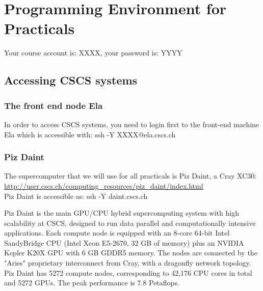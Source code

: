 \documentclass[a4paper,pagesize,12pt]{scrbook}
\begin{document}
\section*{Programming Environment for Practicals}
Your course account is: XXXX, your password is: YYYY

\subsection*{Accessing CSCS systems }
\subsubsection*{The front end node Ela}
In order to access CSCS systems, you need to login first to the front-end machine Ela which is accessible with: \colorbox{mycolor}{ssh -Y XXXX@ela.cscs.ch}

\subsubsection*{Piz Daint}
The supercomputer that we will use for all practicals is Piz Daint, a Cray XC30:\\
\url{ http://user.cscs.ch/computing_resources/piz_daint/index.html}\\
Piz Daint is accessible as: \colorbox{mycolor}{ssh -Y daint.cscs.ch}

Piz Daint is the main GPU/CPU hybrid supercomputing system with high scalability at CSCS, designed to run data parallel and computationally intensive applications.
Each compute node is equipped with an 8-core 64-bit Intel SandyBridge CPU (Intel Xeon E5-2670, 32 GB of memory) plus an NVIDIA Kepler K20X GPU with 6 GB GDDR5 memory. The nodes are connected by the "Aries" proprietary interconnect from Cray, with a dragonfly network topology. Piz Daint has 5272 compute nodes, corresponding to 42,176 CPU cores in total and 5272 GPUs. The peak performance is 7.8 Petaflops. 
\end{document}
